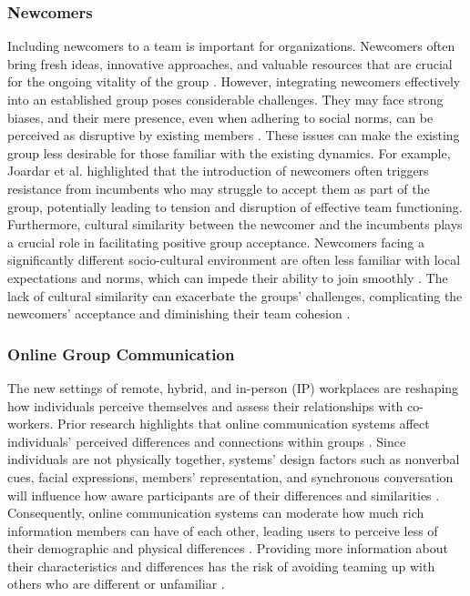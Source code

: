 \subsubsection{Newcomers}
Including newcomers to a team is important for organizations. Newcomers often bring fresh ideas, innovative approaches, and valuable resources that are crucial for the ongoing vitality of the group \cite{zeng2021fresh}. However, integrating newcomers effectively into an established group poses considerable challenges. They may face strong biases, and their mere presence, even when adhering to social norms, can be perceived as disruptive by existing members \cite{kraut2010dealing, spertus2001scaling}. These issues can make the existing group less desirable for those familiar with the existing dynamics. For example, Joardar et al. \cite{joardar2007experimental} highlighted that the introduction of newcomers often triggers resistance from incumbents who may struggle to accept them as part of the group, potentially leading to tension and disruption of effective team functioning. Furthermore, cultural similarity between the newcomer and the incumbents plays a crucial role in facilitating positive group acceptance. Newcomers facing a significantly different socio-cultural environment are often less familiar with local expectations and norms, which can impede their ability to join smoothly \cite{furnham1982social}. The lack of cultural similarity can exacerbate the groups' challenges, complicating the newcomers' acceptance and diminishing their team cohesion \cite{nesdale2000immigrant}. 

\subsubsection{Online Group Communication}
The new settings of remote, hybrid, and in-person (IP) workplaces are reshaping how individuals perceive themselves and assess their relationships with co-workers. Prior research highlights that online communication systems affect individuals' perceived differences and connections within groups \cite{Hall2022,DESCHENES2024100351}. Since individuals are not physically together, systems' design factors such as nonverbal cues, facial expressions, members' representation, and synchronous conversation will influence how aware participants are of their differences and similarities \cite{giambatista2010diversity}. Consequently, online communication systems can moderate how much rich information members can have of each other, leading users to perceive less of their demographic and physical differences \cite{carte2004capabilities,SUH1999295}. Providing more information about their characteristics and differences has the risk of avoiding teaming up with others who are different or unfamiliar \cite{gomez2020impact}. 

